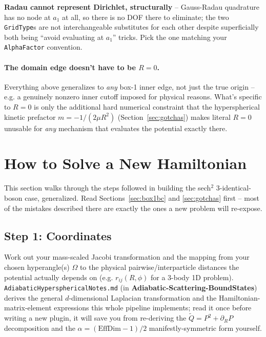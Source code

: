 \documentclass[11pt]{article}
\newcommand{\repo}[1]{\textbf{#1}}
\begin{document}
\textbf{Radau cannot represent Dirichlet, structurally} -- Gauss-Radau quadrature has no node at
$a_1$ at all, so there is no DOF there to eliminate; the two \texttt{GridType}s are not
interchangeable substitutes for each other despite superficially both being ``avoid evaluating at
$a_1$'' tricks. Pick the one matching your \texttt{AlphaFactor} convention.

\paragraph{The domain edge doesn't have to be $R=0$.} Everything above generalizes to \emph{any}
box-1 inner edge, not just the true origin -- e.g. a genuinely nonzero inner cutoff imposed for
physical reasons. What's specific to $R=0$ is only the additional hard numerical constraint that
the hyperspherical kinetic prefactor $m=-1/(2\mu R^2)$ (Section~\ref{sec:gotchas}) makes literal
$R=0$ unusable for \emph{any} mechanism that evaluates the potential exactly there.

\section{How to Solve a New Hamiltonian}
\label{sec:newproblem}

This section walks through the steps followed in building the sech$^2$
3-identical-boson case, generalized. Read Sections~\ref{sec:box1bc} and \ref{sec:gotchas} first --
most of the mistakes described there are exactly the ones a new problem will re-expose.

\subsection*{Step 1: Coordinates}
Work out your mass-scaled Jacobi transformation and the mapping from your chosen hyperangle(s)
$\Omega$ to the physical pairwise/interparticle distances the potential actually depends on
(e.g. $r_{ij}(R,\phi)$ for a 3-body 1D problem). \texttt{AdiabaticHypersphericalNotes.md} (in
\repo{Adiabatic-Scattering-BoundStates}) derives the general $d$-dimensional Laplacian
transformation and the Hamiltonian-matrix-element expressions this whole pipeline implements;
read it once before writing a new plugin, it will save you from re-deriving the
$\tilde Q=P^2+\partial_R P$ decomposition and the $\alpha=(\text{EffDim}-1)/2$ manifestly-symmetric
form yourself.
\end{document}
